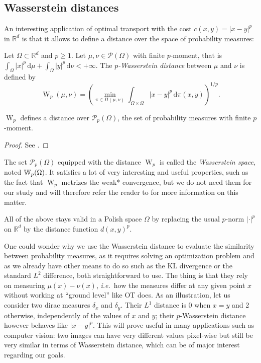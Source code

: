     \subsection{Wasserstein distances}
        An interesting application of optimal transport with the cost $c(x,y)=|x-y|^p$ in $\mathbb{R}^d$ is that it allows to define a distance over the space of probability measures:
        \begin{defi}
            \label{def:w}
            Let $\Omega \subset \mathbb{R}^d$ and $p\geq 1$. Let $\mu,\nu \in\mathcal{P}(\Omega)$ with finite $p$-moment, that is $\int_{\Omega}|x|^p\, \mathrm d\mu+\int_{\Omega}|y|^p\, \mathrm d\nu<+\infty$. The $p$\emph{-Wasserstein distance} between $\mu$ and $\nu$ is defined by
            \begin{equation}
                \operatorname{W}_{p}(\mu,\nu)=\left( \min_{\pi \in \Pi(\mu,\nu)}\int _{\Omega \times \Omega}|x-y|^p\, \mathrm d\pi(x,y)   \right)^{1/p}.
            \end{equation}
        \end{defi}
        \begin{proposition}
            $\operatorname{W}_{p}$ defines a distance over $\mathcal{P}_{p}(\Omega)$, the set of probability measures with finite $p$-moment.
        \end{proposition}
        \begin{proof}
            See \cite[Ch.~5.1]{santambrogio2015optimal}.
        \end{proof}
        The set $\mathcal{P}_{p}(\Omega)$ equipped with the distance $\operatorname{W}_p$ is called the \emph{Wasserstein space}, noted $\mathbb{W}_p(\Omega)$. It satisfies a lot of very interesting and useful properties, such as the fact that $\operatorname{W}_p$ metrizes the weak* convergence, but we do not need them for our study and will therefore refer the reader to \cite{santambrogio2015optimal} for more information on this matter.
        \begin{remark}
            All of the above stays valid in a Polish space $\Omega$ by replacing the usual $p$-norm $|\cdot|^p$ on $\mathbb{R}^d$ by the distance function $d(x,y)^p$.
        \end{remark}
        \begin{remark}
            One could wonder why we use the Wasserstein distance to evaluate the similarity between probability measures, as it requires solving an optimization problem and as we already have other means to do so such as the KL divergence or the standard $L^2$ difference, both straightforward to use. The thing is that they rely on measuring $\mu(x)-\nu(x)$, \textit{i.e.}~how the measures differ at any given point $x$ without working at ``ground level'' like OT does. As an illustration, let us consider two dirac measures $\delta_{x}$ and $\delta_{y}$. Their $L^1$ distance is 0 when $x=y$ and 2 otherwise, independently of the values of $x$ and $y$; their $p$-Wasserstein distance however behaves like $|x-y|^p$. This will prove useful in many applications such as computer vision: two images can have very different values pixel-wise but still be very similar in terms of Wasserstein distance, which can be of major interest regarding our goals.
        \end{remark}
